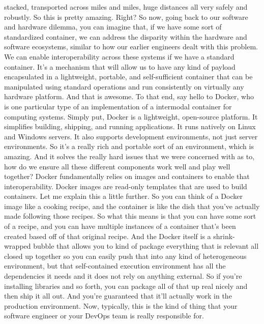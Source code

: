 {{{{{    stacked, transported across miles and miles,
    huge distances all very safely and robustly.
    So this is pretty amazing.
    Right?
    So now, going back to our software and hardware dilemma,
    you can imagine that, if we have some sort of standardized container,
    we can address the disparity within the hardware and software ecosystems,
    similar to how our earlier engineers dealt with this problem.
    We can enable interoperability across these systems
    if we have a standard container.
    It's a mechanism that will allow us to have any kind of payload encapsulated
    in a lightweight, portable, and self-sufficient container
    that can be manipulated using standard operations
    and run consistently on virtually any hardware platform.
    And that is awesome.
    To that end, say hello to Docker, who is one particular type
    of an implementation of a intermodal container for computing systems.
    Simply put, Docker is a lightweight, open-source platform.
    It simplifies building, shipping, and running applications.
    It runs natively on Linux and Windows servers.
    It also supports development environments, not just
    server environments.
    So it's a really rich and portable sort of an environment, which is amazing.
    And it solves the really hard issues that we were concerned with as to,
    how do we ensure all these different components work well
    and play well together?
    Docker fundamentally relies on images and containers
    to enable that interoperability.
    Docker images are read-only templates that are used to build containers.
    Let me explain this a little further.
    So you can think of a Docker image like a cooking recipe,
    and the container is like the dish that you've actually
    made following those recipes.
    So what this means is that you can have some sort of a recipe,
    and you can have multiple instances of a container that's been created based off
    of that original recipe.
    And the Docker itself is a shrink-wrapped bubble that allows you
    to kind of package everything that is relevant all closed up together
    so you can easily push that into any kind of heterogeneous environment,
    but that self-contained execution environment has all the dependencies
    it needs and it does not rely on anything external.
    So if you're installing libraries and so forth, you can package all of that
    up real nicely and then ship it all out.
    And you're guaranteed that it'll actually
    work in the production environment.
    Now, typically, this is the kind of thing
    that your software engineer or your DevOps team is really responsible for.
}}}}}
